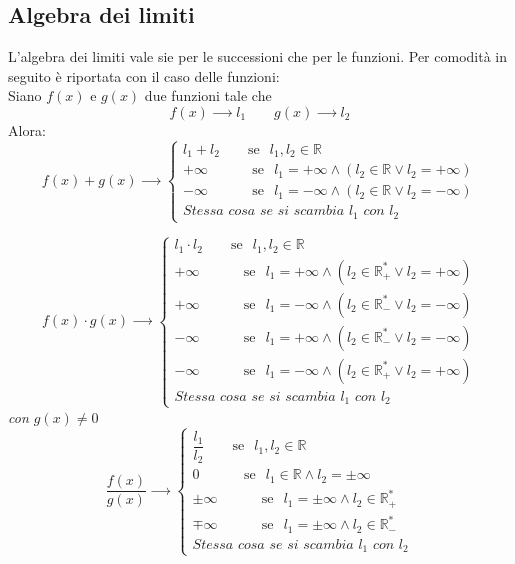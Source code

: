\subsection{Algebra dei limiti}
L'algebra dei limiti vale sie per le successioni che per le funzioni. Per comodità in seguito è riportata con il caso delle funzioni:\\
Siano $f(x)$ e $g(x)$ due funzioni tale che
\begin{equation*}
    f(x) \xrightarrow{\qquad} l_1 \qquad g(x) \xrightarrow{\qquad} l_2
\end{equation*}
Alora:
\begin{equation*}
    f(x)+g(x) \xrightarrow{\qquad}
    \begin{cases*}
        l_1 + l_2 \qquad \text{se}\;\;\, l_1,l_2 \in \mathbb{R}\\
        +\infty \quad\, \qquad \text{se}\;\;\, l_1 = +\infty \land (l_2 \in \mathbb{R} \lor l_2 = +\infty)\\
        -\infty \quad\, \qquad \text{se}\;\;\, l_1 = -\infty \land (l_2 \in \mathbb{R} \lor l_2 = -\infty)\\
        \textit{Stessa cosa se si scambia $l_1$ con $l_2$}
    \end{cases*}
\end{equation*}

\begin{equation*}
    f(x) \cdot g(x) \xrightarrow{\qquad}
    \begin{cases*}
        l_1 \cdot l_2 \qquad \text{se}\;\;\, l_1,l_2 \in \mathbb{R}\\
        +\infty \quad\, \qquad \text{se}\;\;\, l_1 = +\infty \land (l_2 \in \mathbb{R}_+^* \lor l_2 = +\infty)\\
        +\infty \quad\, \qquad \text{se}\;\;\, l_1 = -\infty \land (l_2 \in \mathbb{R}_-^* \lor l_2 = -\infty)\\
        -\infty \quad\, \qquad \text{se}\;\;\, l_1 = +\infty \land (l_2 \in \mathbb{R}_-^* \lor l_2 =-\infty)\\
        -\infty \quad\, \qquad \text{se}\;\;\, l_1 = -\infty \land (l_2 \in \mathbb{R}_+^* \lor l_2 = +\infty)\\
        \textit{Stessa cosa se si scambia $l_1$ con $l_2$}
    \end{cases*}
\end{equation*}
\textit{con $g(x) \neq 0$}
\begin{equation*}
    \dfrac{f(x)}{g(x)} \xrightarrow{\qquad}
    \begin{cases*}
        \dfrac{l_1}{l_2} \qquad \text{se}\;\;\, l_1,l_2 \in \mathbb{R}\\
        0 \quad\, \qquad \text{se}\;\;\, l_1 \in \mathbb{R} \land l_2 = \pm \infty\\
        \pm \infty \quad\, \qquad \text{se}\;\;\, l_1 = \pm \infty \land l_2 \in \mathbb{R}_+^*\\
        \mp \infty \quad\, \qquad \text{se}\;\;\, l_1 = \pm \infty \land l_2 \in \mathbb{R}_-^*\\
        \textit{Stessa cosa se si scambia $l_1$ con $l_2$}
    \end{cases*}
\end{equation*}

